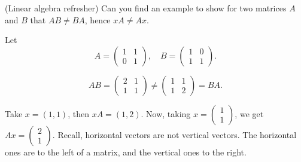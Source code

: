\begin{exercise}(Linear algebra refresher) Can you find an example to
  show for two matrices $A$ and $B$ that $AB\neq BA$, hence
  $x A \neq A x$.
  \begin{hint}
    Let 
    \begin{equation*}
A =
    \begin{pmatrix}
      1 & 1 \\ 
0&1
    \end{pmatrix},
\quad   B=
    \begin{pmatrix}
      1 & 0 \\ 
1&1
    \end{pmatrix}.
    \end{equation*}
  \end{hint}

  \begin{solution}
    \begin{equation*}
      AB =  
    \begin{pmatrix}
      2 & 1 \\ 
1&1
    \end{pmatrix} 
\neq
    \begin{pmatrix}
      1 & 1 \\ 
1&2
    \end{pmatrix} 
= BA.
    \end{equation*}

Take $x=(1,1)$, then $x A=(1,2)$. Now, taking $x=
\begin{pmatrix}
  1 \\
1
\end{pmatrix}
$, we get $Ax = 
\begin{pmatrix}
  2 \\
1
\end{pmatrix}.  $
Recall, horizontal vectors are not vertical vectors. The horizontal
ones are to the left of a matrix, and the vertical ones to the right.
  \end{solution}
\end{exercise}

